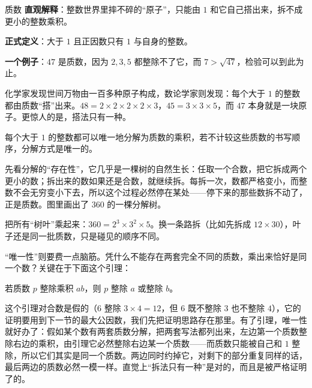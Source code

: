 \begin{shuyu}{质数}
\textbf{直观解释}：整数世界里摔不碎的“原子”，只能由 $1$ 和它自己搭出来，拆不成更小的整数乘积。

\textbf{正式定义}：大于 $1$ 且正因数只有 $1$ 与自身的整数。

\textbf{一个例子}：$47$ 是质数，因为 $2,3,5$ 都整除不了它，而 $7>\sqrt{47}$，检验可以到此为止。
\end{shuyu}

化学家发现世间万物由一百多种原子构成，数论学家则发现：每个大于 $1$ 的整数都由质数“搭”出来。$48=2\times2\times2\times2\times3$，$45=3\times3\times5$，而 $47$ 本身就是一块原子。更惊人的是，搭法只有一种。

\begin{dingli}[算术基本定理]
每个大于 $1$ 的整数都可以唯一地分解为质数的乘积，若不计较这些质数的书写顺序，分解方式是唯一的。
\end{dingli}

先看分解的“存在性”，它几乎是一棵树的自然生长：任取一个合数，把它拆成两个更小的数；拆出来的数如果还是合数，就继续拆。每拆一次，数都严格变小，而整数不会无穷变小下去，所以这个过程必然停在某处——停下来的那些数拆不动了，正是质数。图里画出了 $360$ 的一棵分解树。

\begin{center}
\end{center}

把所有“树叶”乘起来：$360=2^3\times 3^2\times 5$。换一条路拆（比如先拆成 $12\times 30$），叶子还是同一批质数，只是碰见的顺序不同。

“唯一性”则要费一点脑筋。凭什么不能存在两套完全不同的质数，乘出来恰好是同一个数？关键在于下面这个引理：

\begin{tuilun}[质数整除引理]
若质数 $p$ 整除乘积 $ab$，则 $p$ 整除 $a$ 或整除 $b$。
\end{tuilun}

这个引理对合数是假的（$6$ 整除 $3\times 4=12$，但 $6$ 既不整除 $3$ 也不整除 $4$），它的证明要用到下一节的最大公因数，我们先把证明思路存在那里。有了引理，唯一性就好办了：假如某个数有两套质数分解，把两套写法都列出来，左边第一个质数整除右边的乘积，由引理它必然整除右边某一个质数——而质数只能被自己和 $1$ 整除，所以它们其实是同一个质数。两边同时约掉它，对剩下的部分重复同样的话，最后两边的质数必然一模一样。直觉上“拆法只有一种”是对的，而且是被严格证明了的。

